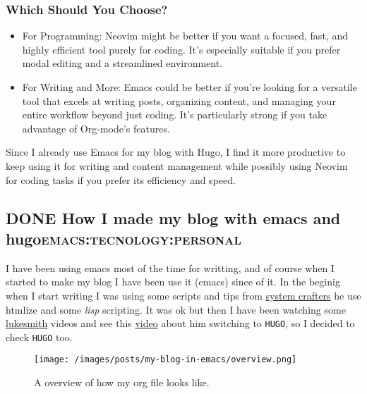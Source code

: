 \documentclass[11pt]{article}
\begin{document}
\subsubsection{Which Should You Choose?}
\label{sec:org58de4d6}
\begin{itemize}
\item For Programming: Neovim might be better if you want a focused, fast, and highly efficient tool purely for coding. It's especially suitable if you prefer modal editing and a streamlined environment.

\item For Writing and More: Emacs could be better if you're looking for a versatile tool that excels at writing posts, organizing content, and managing your entire workflow beyond just coding. It's particularly strong if you take advantage of Org-mode's features.
\end{itemize}

Since I already use Emacs for my blog with Hugo, I find it more productive to keep using it for writing and content management while possibly using Neovim for coding tasks if you prefer its efficiency and speed.
\subsection{{\bfseries\sffamily DONE} How I made my blog with emacs and hugo\hfill{}\textsc{emacs:tecnology:personal}}
\label{sec:orgdf88df7}
\begin{PREVIEW}
I have been using emacs most of the time for writting, and of course when I started to make my blog I have been use it (emacs) since of it. In the beginig when I start writing I was using some scripts and tips from \href{https://systemcrafters.net/}{system crafters} he use htmlize and some \emph{lisp} scripting. It was ok but then I have been watching some \href{https://www.youtube.com/@LukeSmithxyz}{lukesmith} videos and see this \href{https://www.youtube.com/watch?v=jAXKSKb3etk\&pp=ygUOaHVnbyBsdWtlc21pdGg\%3D}{video} about him switching to \texttt{HUGO}, so I decided to check \texttt{HUGO} too.
\end{PREVIEW}

\begin{center}
\begin{figure}[htbp]
\centering
\texttt{[image: /images/posts/my-blog-in-emacs/overview.png]}
\caption{A overview of how my org file looks like.}
\end{figure}
\end{center}
\end{document}
